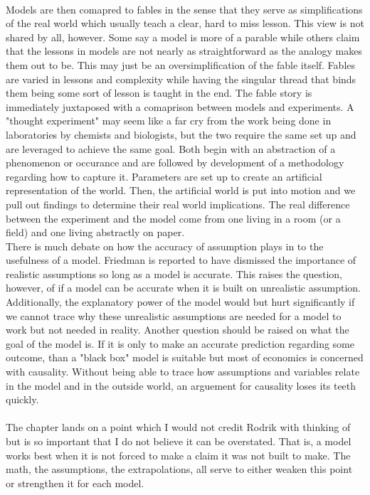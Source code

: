 \\
\indent Models are then comapred to fables in the sense that they serve as simplifications of the real world which usually teach a clear, hard to miss lesson. This view is not shared by all, however. Some say a model is more of a parable while others claim that the lessons in models are not nearly as straightforward as the analogy makes them out to be. This may just be an oversimplification of the fable itself. Fables are varied in lessons and complexity while having the singular thread that binds them being some sort of lesson is taught in the end. The fable story is immediately juxtaposed with a comaprison between models and experiments. A "thought experiment" may seem like a far cry from the work being done in laboratories by chemists and biologists, but the two require the same set up and are leveraged to achieve the same goal. Both begin with an abstraction of a phenomenon or occurance and are followed by development of a methodology regarding how to capture it. Parameters are set up to create an artificial representation of the world. Then, the artificial world is put into motion and we pull out findings to determine their real world implications. The real difference between the experiment and the model come from one living in a room (or a field) and one living abstractly on paper.
\\
\indent There is much debate on how the accuracy of assumption plays in to the usefulness of a model. Friedman is reported to have dismissed the importance of realistic assumptions so long as a model is accurate. This raises the question, however, of if a model can be accurate when it is built on unrealistic assumption. Additionally, the explanatory power of the model would but hurt significantly if we cannot trace why these unrealistic assumptions are needed for a model to work but not needed in reality. Another question should be raised on what the goal of the model is. If it is only to make an accurate prediction regarding some outcome, than a "black box" model is suitable but most of economics is concerned with causality. Without being able to trace how assumptions and variables relate in the model and in the outside world, an arguement for causality loses its teeth quickly.\\
\\
\indent The chapter lands on a point which I would not credit Rodrik with thinking of but is so important that I do not believe it can be overstated. That is, a model works best when it is not forced to make a claim it was not built to make. The math, the assumptions, the extrapolations, all serve to either weaken this point or strengthen it for each model.



